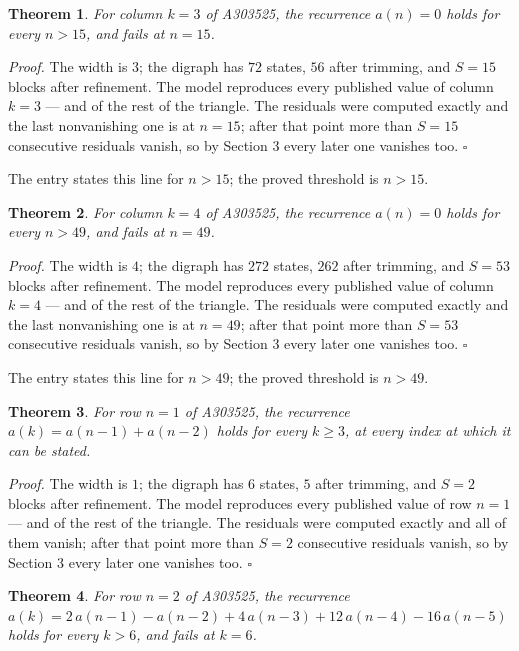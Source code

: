 \documentclass[11pt]{article}
\newtheorem{theorem}{Theorem}
\theoremstyle{definition}
\begin{document}
\begin{theorem} For column $k = 3$ of A303525, the recurrence $a(n) = 0$ holds for every $n > 15$, and fails at $n = 15$.\end{theorem}

{\itshape Proof.} The width is $3$; the digraph has $72$ states, $56$ after trimming, and $S = 15$ blocks after refinement. The model reproduces every published value of column $k = 3$ --- and of the rest of the triangle. The residuals were computed exactly and the last nonvanishing one is at $n = 15$; after that point more than $S = 15$ consecutive residuals vanish, so by Section 3 every later one vanishes too. $\square$

The entry states this line for $n > 15$; the proved threshold is $n > 15$.

\begin{theorem} For column $k = 4$ of A303525, the recurrence $a(n) = 0$ holds for every $n > 49$, and fails at $n = 49$.\end{theorem}

{\itshape Proof.} The width is $4$; the digraph has $272$ states, $262$ after trimming, and $S = 53$ blocks after refinement. The model reproduces every published value of column $k = 4$ --- and of the rest of the triangle. The residuals were computed exactly and the last nonvanishing one is at $n = 49$; after that point more than $S = 53$ consecutive residuals vanish, so by Section 3 every later one vanishes too. $\square$

The entry states this line for $n > 49$; the proved threshold is $n > 49$.

\begin{theorem} For row $n = 1$ of A303525, the recurrence $a(k) = a(n-1) + a(n-2)$ holds for every $k \ge 3$, at every index at which it can be stated.\end{theorem}

{\itshape Proof.} The width is $1$; the digraph has $6$ states, $5$ after trimming, and $S = 2$ blocks after refinement. The model reproduces every published value of row $n = 1$ --- and of the rest of the triangle. The residuals were computed exactly and all of them vanish; after that point more than $S = 2$ consecutive residuals vanish, so by Section 3 every later one vanishes too. $\square$

\begin{theorem} For row $n = 2$ of A303525, the recurrence $a(k) = 2\,a(n-1) - a(n-2) + 4\,a(n-3) + 12\,a(n-4) - 16\,a(n-5)$ holds for every $k > 6$, and fails at $k = 6$.\end{theorem}
\end{document}

